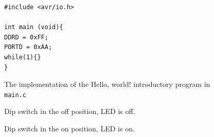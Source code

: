 \documentclass[a4paper]{article}
\begin{document}
\begin{figure}[h]
\begin{lstlisting}[style=CStyle]
#include <avr/io.h>

int main (void){
DDRD = 0xFF;
PORTD = 0xAA;
while(1){}
}
\end{lstlisting}
\caption{The implementation of the Hello, world! introductory program in \texttt{main.c}}
\end{figure}

\begin{figure}[h]
	\centering
	\begin{minipage}[t]{0.45\textwidth}
		\centering
		\caption{Dip switch in the off position, LED is off.}
	\end{minipage}
	\hspace{1cm}
	\begin{minipage}[t]{0.45\textwidth}
		\centering
		\caption{Dip switch in the on position, LED is on.}
	\end{minipage}
\end{figure}
\end{document}
